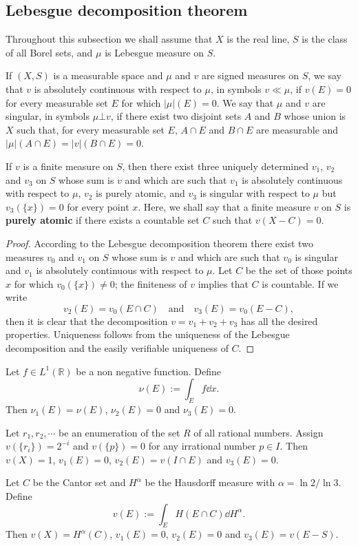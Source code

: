 \subsection{Lebesgue decomposition theorem}

Throughout this subsection we shall assume that $X$ is the real line, 
$S$ is the class of all Borel sets,
and $\mu$ is Lebesgue measure on $S$.

If $(X, S)$ is a measurable space and $\mu$ and $v$ are signed measures on $S$, 
we say that $v$ is absolutely continuous with respect to $\mu$,
in symbols $v \ll \mu$, if $v(E) = 0$ for every measurable set $E$ for which $|\mu|(E) = 0$.
We say that $\mu$ and $v$ are singular, in symbols $\mu \bot v$,
if there exist two disjoint sets $A$ and $B$ whose union is $X$ such that,
for every measurable set $E$, $A\cap E$ and $B\cap E$ are measurable and 
$|\mu|(A\cap E) = |v|(B\cap E) = 0$.


\begin{theorem}
  \label{thm: Lebesgue decomposition theorem}
  If $v$ is a finite measure on $S$, 
  then there exist three uniquely determined $v_1$, $v_2$ and $v_3$ on $S$
  whose sum is $v$ and which are such that $v_1$ is absolutely continuous with respect to $\mu$, 
  $v_2$ is purely atomic, 
  and $v_3$ is singular with respect to $\mu$ but $v_3(\{x\}) = 0$ for every point $x$.
  Here, we shall say that a finite measure $v$ on $S$ is \textbf{purely atomic} 
  if there exists a countable set $C$ such that $v(X-C) = 0$.
\end{theorem}

\begin{proof}
  According to the Lebesgue decomposition theorem there exist two measures $v_0$ and $v_1$ on $S$ 
  whose sum is $v$ and which are such that $v_0$ is singular 
  and $v_1$ is absolutely continuous with respect to $\mu$.
  Let $C$ be the set of those points $x$ for which $v_0(\{x\}) \neq 0$; the finiteness of $v$ implies that 
  $C$ is countable. If we write 
  \[
  v_2(E) = v_0(E\cap C) \quad \text{and}\quad v_3(E) = v_0(E-C),
  \]
  then it is clear that the decomposition $v = v_1 + v_2 + v_3$ has all the desired properties.
  Uniqueness follows from the uniqueness of the Lebesgue decomposition 
  and the easily verifiable uniqueness of $C$.
\end{proof}

\begin{example}
  Let $f\in L^1(\mathbb R)$ be a non negative function. 
  Define 
  \[
  \nu(E) := \int_Ef\dd x.
  \]
  Then $\nu_1(E) = \nu(E)$, $\nu_2(E) = 0$ and $\nu_3(E) = 0$.

  Let $r_1, r_2, \cdots$ be an enumeration of the set $R$ of all rational numbers. 
  Assign $v(\{r_i\}) = 2^{-i}$ and $v(\{p\}) = 0$ for any irrational number $p\in I$.
  Then $v(X) = 1$, $v_1(E) = 0$, $v_2(E) = v(I\cap E)$ and $v_3(E) = 0$.

  Let $C$ be the Cantor set and $H^{\alpha}$ be the Hausdorff measure with $\alpha=\ln 2/\ln3$.
  Define 
  \[
  v(E) := \int_E H(E\cap C)\dd H^\alpha.
  \]
  Then $v(X) = H^\alpha(C)$, $v_1(E) = 0$, $v_2(E) = 0$ and $v_3(E) = v(E-S)$.
\end{example}


